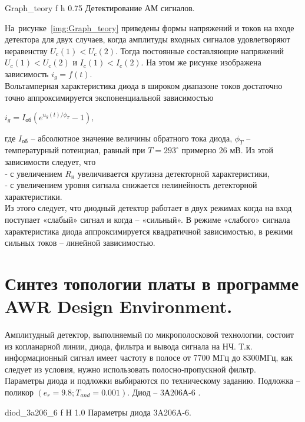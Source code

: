 \documentclass{bmstu}
\begin{document}
		{Graph_teory}
		{f} %
		{h} %
		{0.75\textwidth} %
		{Детектирование АМ сигналов.} %
	
\indent	На~рисунке~\ref{img:Graph_teory} приведены 
	формы
	напряжений и токов на входе детектора для двух случаев, когда амплитуды входных
	сигналов удовлетворяют неравенству $U_c(1) < U_c(2)$. Тогда постоянные 
	составляющие напряжений $U_c(1) < U_c(2)$ и $I_c(1) < I_c(2)$. На этом же 
	рисунке изображена зависимость $i_g = f(t)$. \\
\indent	Вольтамперная характеристика диода в широком диапазоне токов достаточно 
	точно аппроксимируется экспоненциальной зависимостью
	\begin{center}
		$i_g = I_\text{об} (e^{u_g(t)/\phi_T} - 1),$
	\end{center}

\indent где $I_\text{об}$ – абсолютное значение величины обратного тока диода,
	$\phi_T$ – температурный потенциал, равный при $T = 293^{\circ}$ примерно 26
	мВ. Из этой зависимости следует, что \\
\indent	‐ с увеличением $R_\text{н}$ увеличивается крутизна детекторной
	характеристики, \\
\indent	‐ с увеличением уровня сигнала снижается нелинейность детекторной 
	характеристики. \\
\indent	Из этого следует, что диодный детектор работает в двух режимах когда на вход
	поступает «слабый» сигнал и когда – «сильный». В режиме «слабого» сигнала
	характеристика диода аппроксимируется квадратичной зависимостью, в режими 
	сильных токов – линейной зависимостью.
	
	
	\chapter{Синтез топологии платы в программе AWR Design Environment.}
	
	Амплитудный детектор, выполняемый по микрополосковой технологии, состоит из 
	копланарной линии, диода, фильтра и вывода сигнала на НЧ. Т.к. информационный 
	сигнал имеет частоту в полосе от 7700 МГц до 8300МГц, как следует из условия, 
	нужно использовать полосно‐пропускной фильтр. \\
\indent	Параметры диода и подложки выбираются по техническому заданию. Подложка – 
	поликор $(e_r = 9.8; T_{and} = 0.001)$. Диод – 3А206А-6 \cite{8}.
	
	{diod_3a206_6}
	{f} %
	{H} %
	{1.0\textwidth} %
	{Параметры диода 3A206A-6.} %
	
\end{document}

